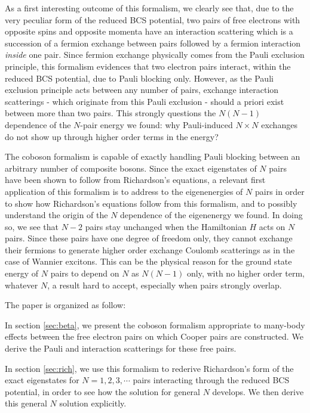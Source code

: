 \documentclass[epj]{svjour}
\begin{document}
As a first interesting outcome of this formalism, we clearly see that, due to the very peculiar form of the reduced BCS potential, two pairs of free electrons with opposite spins and opposite momenta have an interaction scattering which is a succession of a fermion exchange between pairs followed by a fermion interaction \textit{inside} one pair. Since fermion exchange physically comes from the Pauli exclusion principle, this formalism evidences that two electron pairs interact, within the reduced BCS potential, due to Pauli blocking only. However, as the Pauli exclusion principle acts between any number of pairs, exchange interaction scatterings - which originate from this Pauli exclusion - should a priori exist between more than two pairs. This strongly questions the $N(N-1)$ dependence of the $N$-pair energy we found: why Pauli-induced $N\times{}N$ exchanges do not show up through higher order terms in the energy?

The coboson formalism is capable of exactly handling Pauli blocking between an arbitrary number of composite bosons. Since the exact eigenstates of $N$ pairs have been shown to follow from Richardson's equations, a relevant first application of this formalism  is to address to the eigenenergies of $N$ pairs in order to show how  Richardson's equations follow from this formalism, and to possibly understand the origin of the  $N$ dependence of the eigenenergy we found. In doing so, we see that $N-2$ pairs stay unchanged when the Hamiltonian $H$ acts on $N$ pairs. Since these pairs have one degree of freedom only, they cannot exchange their fermions to generate higher order exchange Coulomb scatterings as in the case of Wannier excitons. This can be the physical reason for the ground state energy of $N$ pairs to depend on $N$ as $N(N-1)$ only, with no higher order term, whatever $N$, a result hard to accept, especially when pairs strongly overlap.


The paper is organized as follow:

In section \ref{sec:beta}, we present the coboson formalism appropriate to many-body effects between the free
electron pairs on which Cooper pairs are constructed. We derive the Pauli and interaction scatterings for these free pairs.

In section 
\ref{sec:rich}, we use this formalism to rederive Richardson's form of the
exact eigenstates for $N=1,2,3,\cdots$ pairs interacting through the reduced
BCS potential, in order to see how the solution for general $N$ develops. We then derive this general $N$ solution explicitly.
\end{document}
